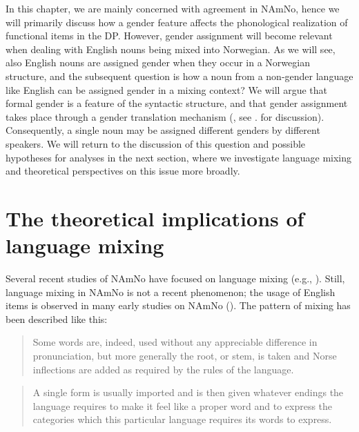 \documentclass[output=paper]{langscibook}
\begin{document}
In this chapter, we are mainly concerned with agreement in NAmNo, hence we will primarily discuss how a gender feature affects the phonological realization of functional items in the DP. However, gender assignment will become relevant when dealing with English nouns being mixed into Norwegian. As we will see, also English nouns are assigned gender when they occur in a Norwegian structure, and the subsequent question is how a noun from a non-gender language like English can be assigned gender in a mixing context? We will argue that formal gender is a feature of the syntactic structure, and that gender assignment takes place through a gender translation mechanism (\citealt{ÅfarliEtAl2021}, see . for discussion). Consequently, a single noun may be assigned different genders by different speakers. We will return to the discussion of this question and possible hypotheses for analyses in the next section, where we investigate language mixing and theoretical perspectives on this issue more broadly.


\section{The theoretical implications of language mixing}\label{sec:riksem:4}
\begin{sloppypar}
Several recent studies of NAmNo have focused on language mixing (e.g., \citealt{GrimstadEtAl2014, Åfarli2015, AlexiadouEtAl2015, Grimstad2018, Riksem2018Thesis, RiksemEtAl2019, RiksemEtAl2021}). Still, language mixing in NAmNo is not a recent phenomenon; the usage of English items is observed in many early studies on NAmNo (\citealt{Flaten1900, Flom1900, Flom1903, Flom1926, Hjelde1992, Haugen1953}). The pattern of mixing has been described like this: 
\end{sloppypar}

\begin{quote}
Some words are, indeed, used without any appreciable difference in pronunciation, but more generally the root, or stem, is taken and Norse inflections are added as required by the rules of the language. \citep[115]{Flaten1900}
\end{quote}


\begin{quote}
A single form is usually imported and is then given whatever endings the language requires to make it feel like a proper word and to express the categories which this particular language requires its words to express. \citep[440]{Haugen1953}
\end{quote}
\end{document}

